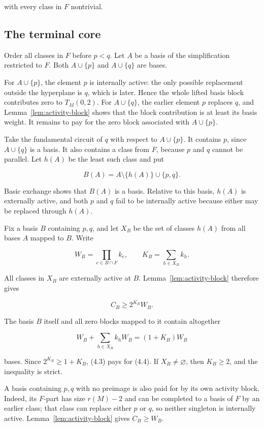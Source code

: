 \documentclass[11pt]{article}
\begin{document}
with every class in \(F\) nontrivial.

\subsection{The terminal core}


Order all classes in \(F\) before \(p<q\). Let \(A\) be a basis of the
simplification restricted to \(F\). Both \(A\cup\{p\}\) and
\(A\cup\{q\}\) are bases.

For \(A\cup\{p\}\), the element \(p\) is internally active: the only
possible replacement outside the hyperplane is \(q\), which is later. Hence
the whole lifted basis block contributes zero to \(T_M(0,2)\). For
\(A\cup\{q\}\), the earlier element \(p\) replaces \(q\), and Lemma~\ref{lem:activity-block}
shows that the block contribution is at least its basis weight. It remains to
pay for the zero block associated with \(A\cup\{p\}\).

Take the fundamental circuit of \(q\) with respect to \(A\cup\{p\}\). It
contains \(p\), since \(A\cup\{q\}\) is a basis. It also contains a class
from \(F\), because \(p\) and \(q\) cannot be parallel. Let \(h(A)\) be the
least such class and put

\[
B(A)=A\setminus\{h(A)\}\cup\{p,q\}.            \tag{4.2}
\]

Basic exchange shows that \(B(A)\) is a basis. Relative to this basis,
\(h(A)\) is externally active, and both \(p\) and \(q\) fail to be internally
active because either may be replaced through \(h(A)\).

Fix a basis \(B\) containing \(p,q\), and let \(X_B\) be the set of classes
\(h(A)\) from all bases \(A\) mapped to \(B\). Write

\[
W_B=\prod_{e\in B\cap F}k_e,
\qquad
K_B=\sum_{h\in X_B}k_h.
\]

All classes in \(X_B\) are externally active at \(B\). Lemma~\ref{lem:activity-block} therefore
gives

\[
C_B\ge 2^{K_B}W_B.                             \tag{4.3}
\]

The basis \(B\) itself and all zero blocks mapped to it contain altogether

\[
W_B+\sum_{h\in X_B}k_hW_B=(1+K_B)W_B           \tag{4.4}
\]

bases. Since \(2^{K_B}\ge1+K_B\), (4.3) pays for (4.4). If
\(X_B\ne\varnothing\), then \(K_B\ge2\), and the inequality is strict.

A basis containing \(p,q\) with no preimage is also paid for by its own
activity block. Indeed, its \(F\)-part has size \(r(M)-2\) and can be completed
to a basis of \(F\) by an earlier class; that class can replace either \(p\)
or \(q\), so neither singleton is internally active. Lemma~\ref{lem:activity-block} gives
\(C_B\ge W_B\).
\end{document}
